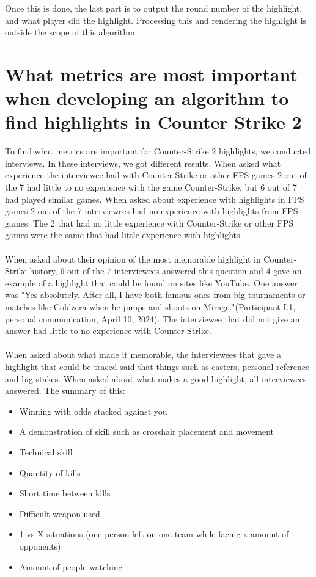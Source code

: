 Once this is done, the last part is to output the round number of the highlight, and what player did the highlight. Processing this and rendering the highlight is outside the scope of this algorithm.
\section{What metrics are most important when developing an algorithm to find highlights in Counter Strike 2}

To find what metrics are important for Counter-Strike 2 highlights, we conducted interviews. In these interviews, we got different results. When asked what experience the interviewee had with Counter-Strike or other FPS games 2 out of the 7 had little to no experience with the game Counter-Strike, but 6 out of 7 had played similar games. When asked about experience with highlights in FPS games 2 out of the 7 interviewees had no experience with highlights from FPS games. The 2 that had no little experience with Counter-Strike or other FPS games were the same that had little experience with highlights.\\\\
When asked about their opinion of the most memorable highlight in Counter-Strike history, 6 out of the 7 interviewees answered this question and 4 gave an example of a highlight that could be found on sites like YouTube. One answer was "Yes absolutely. After all, I have both famous ones from big tournaments or matches like Coldzera when he jumps and shoots on Mirage."(Participant L1, personal communication, April 10, 2024). The interviewee that did not give an answer had little to no experience with Counter-Strike.\\\\
When asked about what made it memorable, the interviewees that gave a highlight that could be traced said that things such as casters, personal reference and big stakes. When asked about what makes a good highlight, all interviewees answered. The summary of this:
\begin{itemize}
    \item Winning with odds stacked against you
    \item A demonstration of skill such as \gls{crosshair} placement and movement
    \item Technical skill
    \item Quantity of kills
    \item Short time between kills
    \item Difficult weapon used
    \item 1 vs X situations (one person left on one team while facing x amount of opponents)
    \item Amount of people watching
\end{itemize}
